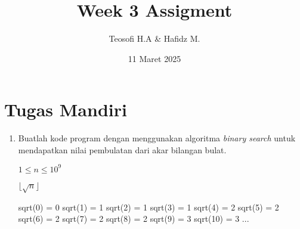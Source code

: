 \documentclass{article}
\title{\textbf{Week 3 Assigment}}
\date{11 Maret 2025}
\author{Teosofi H.A \& Hafidz M.}
\begin{document}
  \maketitle
  \section*{Tugas Mandiri}
  \begin{enumerate}
    \item Buatlah kode program dengan menggunakan algoritma \textit{binary search} untuk mendapatkan nilai pembulatan dari akar bilangan bulat.
    \begin{req}
        $1 \leq n \leq 10^9$
    \end{req}
    \begin{out}
        $\lfloor\sqrt{n}\rfloor$ 
    \end{out}
    \begin{RunCode}
sqrt(0) = 0
sqrt(1) = 1
sqrt(2) = 1
sqrt(3) = 1
sqrt(4) = 2
sqrt(5) = 2
sqrt(6) = 2
sqrt(7) = 2
sqrt(8) = 2
sqrt(9) = 3
sqrt(10) = 3
...
    \end{RunCode}
    

\end{enumerate}
\end{document}
